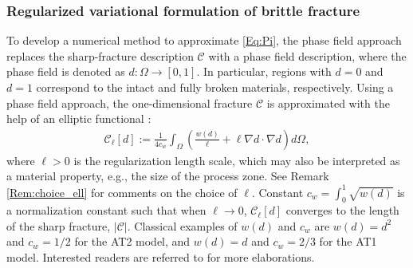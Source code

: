 \subsubsection{Regularized variational formulation of brittle fracture}
To develop a numerical method to approximate \eqref{Eq:Pi}, {the phase field approach replaces} the sharp-fracture description $\mathcal{C}$ with a phase field description, where the phase field is denoted as  $d:\Omega\rightarrow[0,1]$. In particular, regions with $d = 0$ and $d = 1$ correspond to the intact and fully broken materials, respectively. Using a phase field approach, the one-dimensional fracture $\mathcal{C}$ is approximated with the help of an elliptic %
functional \cite{ambrosio1990approximation, ambrosio1992approximation}:
\begin{equation}\label{Eq:Gamma_ell}
    \begin{aligned}
    \mathcal{C}_\ell[d]:=\frac{1}{4c_w}\int_\Omega\left(\frac{w(d)}{\ell} + \ell \nabla d\cdot\nabla d\right) d\Omega,  
    \end{aligned}
\end{equation}
where $\ell>0$ is the regularization length scale, which may also be interpreted as a material property, e.g., the size of the process zone. See Remark \ref{Rem:choice_ell} for comments on the choice of $\ell$. Constant $c_w=\int_{0}^{1} \sqrt{w(d)}$ is a normalization constant such that when $\ell\rightarrow 0$, {$\mathcal{C}_\ell[d]$} converges to the {length of the} sharp fracture{, $|\mathcal{C}|$}. Classical examples of $w(d)$ and $c_{w}$ are $w(d)=d^2$ and $c_{w}=1/2$ for the AT2 model, and $w(d)=d$ and $c_{w}=2/3$ for the AT1 model. Interested readers are referred to \cite{tanne2018crack,Bourdin2014014301} %
for more elaborations.

